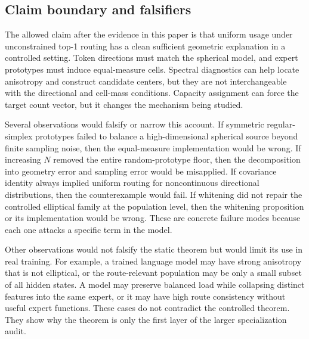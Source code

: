 \subsection{Claim boundary and falsifiers}

The allowed claim after the evidence in this paper is that uniform usage under
unconstrained top-1 routing has a clean sufficient geometric explanation in a
controlled setting. Token directions must match the spherical model, and expert
prototypes must induce equal-measure cells. Spectral diagnostics can help locate
anisotropy and construct candidate centers, but they are not interchangeable
with the directional and cell-mass conditions. Capacity assignment can force the
target count vector, but it changes the mechanism being studied.

Several observations would falsify or narrow this account. If symmetric
regular-simplex prototypes failed to balance a high-dimensional spherical
source beyond finite sampling noise, then the equal-measure implementation
would be wrong. If increasing $N$ removed the entire random-prototype floor,
then the decomposition into geometry error and sampling error would be
misapplied. If covariance identity always implied uniform routing for
noncontinuous directional distributions, then the counterexample would fail.
If whitening did not repair the controlled elliptical family at the population
level, then the whitening proposition or its implementation would be wrong.
These are concrete failure modes because each one attacks a specific term in
the model.

Other observations would not falsify the static theorem but would limit its use
in real training. For example, a trained language model may have strong
anisotropy that is not elliptical, or the route-relevant population may be only
a small subset of all hidden states. A model may preserve balanced load while
collapsing distinct features into the same expert, or it may have high route
consistency without useful expert functions. These cases do not contradict the
controlled theorem. They show why the theorem is only the first layer of the
larger specialization audit.
